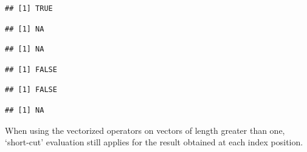\documentclass[krantz2]{krantz}\usepackage{knitr}
\begin{document}
\begin{knitrout}\footnotesize
{}\color{fgcolor}\begin{kframe}
\begin{alltt}
 \hlopt{||} 
\end{alltt}
\begin{verbatim}
## [1] TRUE
\end{verbatim}
\begin{alltt}
 \hlopt{||} 
\end{alltt}
\begin{verbatim}
## [1] NA
\end{verbatim}
\begin{alltt}
 \hlopt{&&} 
\end{alltt}
\begin{verbatim}
## [1] NA
\end{verbatim}
\begin{alltt}
 \hlopt{&&} 
\end{alltt}
\begin{verbatim}
## [1] FALSE
\end{verbatim}
\begin{alltt}
 \hlopt{&&}  \hlopt{&&} 
\end{alltt}
\begin{verbatim}
## [1] FALSE
\end{verbatim}
\begin{alltt}
 \hlopt{&&}  \hlopt{&&} 
\end{alltt}
\begin{verbatim}
## [1] NA
\end{verbatim}
\end{kframe}
\end{knitrout}

When using the vectorized operators on vectors of length greater than one, `short-cut' evaluation still applies for the result obtained at each index position.
\end{document}
